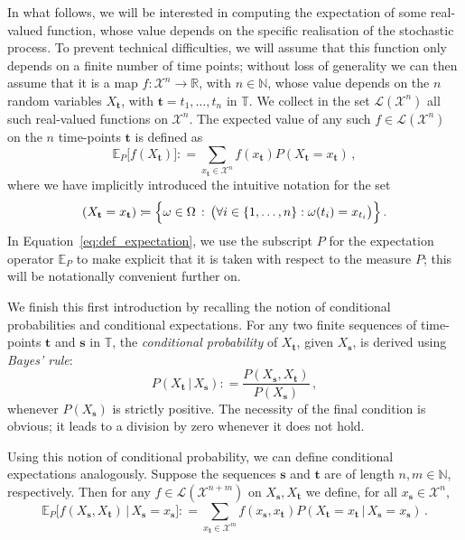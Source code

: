 \documentclass[graybox]{svmult}
\newcommand{\nats}{\mathbb{N}}
\newcommand{\reals}{\mathbb{R}}
\newcommand{\states}{\mathcal{X}}
\newcommand{\gambles}{\mathcal{L}}
\newcommand{\coloneqq}{:\!=}
\newcommand{\timedim}{\mathbb{T}}
\begin{document}
In what follows, we will be interested in computing the expectation of some real-valued function, whose value depends on the specific realisation of the stochastic process. To prevent technical difficulties, we will assume that this function only depends on a finite number of time points; without loss of generality we can then assume that it is a map $f:\states^n\to\reals$, with $n\in\nats$, whose value depends on the $n$ random variables $X_\mathbf{t}$, with $\mathbf{t}=t_1,\ldots,t_{n}$ in $\timedim$. We collect in the set $\gambles(\states^n)$ all such real-valued functions on $\states^n$. The expected value of any such $f\in\gambles(\states^n)$ on the $n$ time-points $\mathbf{t}$ is defined as
\begin{equation}\label{eq:def_expectation}
\mathbb{E}_P\bigr[f(X_\mathbf{t})\bigr] \coloneqq \sum_{x_\mathbf{t}\in\states^n}f(x_\mathbf{t}) P(X_\mathbf{t}=x_\mathbf{t})\,,
\end{equation}
where we have implicitly introduced the intuitive notation for the set
\begin{equation*}
(X_\mathbf{t}=x_\mathbf{t}) \coloneqq \Bigl\{\omega\in\Omega\,:\,\bigl(\forall i\in\{1,\ldots,n\}:\omega(t_i)=x_{t_i}\bigr)\Bigr\}\,.
\end{equation*}
In Equation~\eqref{eq:def_expectation}, we use the subscript $P$ for the expectation operator $\mathbb{E}_P$ to make explicit that it is taken with respect to the measure $P$; this will be notationally convenient further on.

We finish this first introduction by recalling the notion of conditional probabilities and conditional expectations. For any two finite sequences of time-points $\mathbf{t}$ and $\mathbf{s}$ in $\timedim$, the \emph{conditional probability} of $X_\mathbf{t}$, given $X_\mathbf{s}$, is derived using \emph{Bayes' rule}:
\begin{equation*}
P(X_\mathbf{t}\,\vert\,X_\mathbf{s}) \coloneqq \frac{P(X_\mathbf{s},X_\mathbf{t})}{P(X_\mathbf{s})}\,,
\end{equation*}
whenever $P(X_\mathbf{s})$ is strictly positive. The necessity of the final condition is obvious; it leads to a division by zero whenever it does not hold.

Using this notion of conditional probability, we can define conditional expectations analogously. Suppose the sequences $\mathbf{s}$ and $\mathbf{t}$ are of length $n,m\in\nats$, respectively. Then for any $f\in\gambles(\states^{n+m})$ on $X_\mathbf{s},X_\mathbf{t}$ we define, for all $x_\mathbf{s}\in\states^n$,
\begin{equation*}
\mathbb{E}_P\bigl[f(X_\mathbf{s},X_\mathbf{t})\,\big\vert\,X_\mathbf{s}=x_\mathbf{s}\bigr] \coloneqq \sum_{x_\mathbf{t}\in\states^m} f(x_\mathbf{s},x_\mathbf{t})P(X_\mathbf{t}=x_\mathbf{t}\,\vert\,X_\mathbf{s}=x_\mathbf{s})\,.
\end{equation*}
\end{document}
